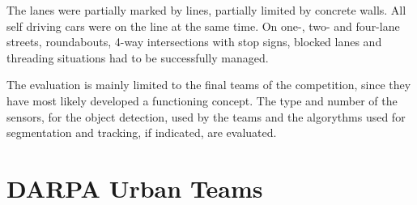 \documentclass[11pt,oneside,openright]{mpreport}
\begin{document}
The lanes were partially marked by lines, partially limited by concrete walls. All self driving cars were on the line at the same time.
On one-, two- and four-lane streets, roundabouts, 4-way intersections with stop signs, blocked lanes and threading situations had to be successfully managed.
 

The evaluation is mainly limited to the final teams of the competition, since they have most likely developed a functioning concept.
The type and number of the sensors, for the object detection, used by the teams and the algorythms used for segmentation and tracking, if indicated, are evaluated.


\section{DARPA Urban Teams}
\end{document}

